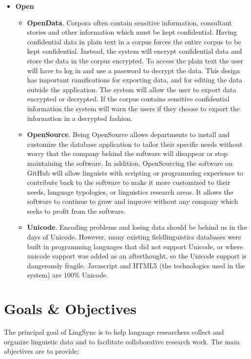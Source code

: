 \documentclass[12pt]{article}
\begin{document}
\begin{itemize}
\item{\bf Open}
\begin{itemize}
\item {\bf OpenData}. Corpora often contain sensitive information, consultant stories and other information which must be kept confidential. Having confidential data in plain text in a corpus forces the entire corpus to be kept confidential. Instead, the system will encrypt confidential data and store the data in the corpus encrypted. To access the plain text the user will have to log in and use a password to decrypt the data. This design has important ramifications for exporting data, and for editing the data outside the application. The system will allow the user to export data encrypted or decrypted. If the corpus contains sensitive confidential information the system will warn the users if they choose to export the information in a decrypted fashion.
\item { \bf OpenSource}. Being OpenSource allows departments to install and customize the database application to tailor their specific needs without worry that the company behind the software will disappear or stop maintaining the software. In addition, OpenSourcing the software on GitHub will allow linguists with scripting or programming experience to contribute back to the software to make it more customized to their needs, language typologies, or linguistics research areas. It allows the software to continue to grow and improve without any company which seeks to profit from the software.
\item {\bf Unicode}. Encoding problems and losing data should be behind us in the days of Unicode. However, many existing fieldlinguistics databases were built in programming languages that did not support Unicode, or where unicode support was added as an afterthought, so the Unicode support is dangerously fragile. Javascript and HTML5 (the technologies used in the system) are 100\% Unicode.
\end{itemize}

\end{itemize}


\section {Goals \& Objectives}

The principal goal of LingSync is to help language researchers collect and organize linguistic data and to facilitate collaborative research work. The main objectives are to provide: 
\end{document}
